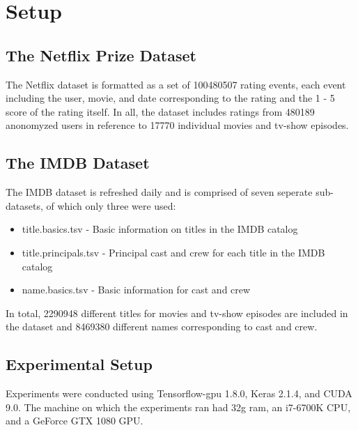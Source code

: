 \section{Setup}
\subsection{The Netflix Prize Dataset}
The Netflix dataset is formatted as a set of 100480507 rating events, each event including the user, movie, and date corresponding to the rating and the 1 - 5 score of the rating itself. In all, the dataset includes ratings from 480189 anonomyzed users in reference to 17770 individual movies and tv-show episodes. 
\subsection{The IMDB Dataset}
The IMDB dataset is refreshed daily and is comprised of seven seperate sub-datasets, of which only three were used: 
\begin{itemize}
	\item title.basics.tsv - Basic information on titles in the IMDB catalog
	\item title.principals.tsv - Principal cast and crew for each title in the IMDB catalog
	\item name.basics.tsv - Basic information for cast and crew
\end{itemize} 
In total, 2290948 different titles for movies and tv-show episodes are included in the dataset and 8469380 different names corresponding to cast and crew.
\subsection{Experimental Setup}
Experiments were conducted using Tensorflow-gpu 1.8.0, Keras 2.1.4, and CUDA 9.0. The machine on which the experiments ran had 32g ram, an i7-6700K CPU, and a GeForce GTX 1080 GPU. 